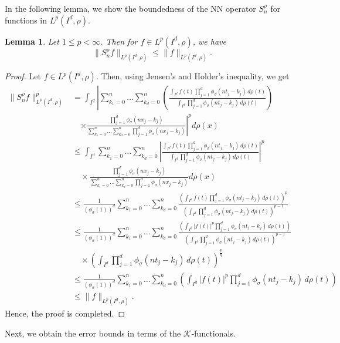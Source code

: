 \documentclass[12pt, reqno]{amsart}
\numberwithin{equation}{section}
\newtheorem{lemma}[theorem]{Lemma}
\theoremstyle{definition}
\theoremstyle{remark}
\numberwithin{equation}{section}
\newcommand{\LP}{L^p(I^d, \rho)}
\begin{document}
In the following lemma, we show the boundedness of the NN operator $S_n^\rho$ for functions in $\LP.$
\begin{lemma} \label{oplpboubd}
Let $1\leq p<\infty$. Then for $f\in \LP$, we have
$$\|S^{\rho}_nf\|_{\LP}\leq\|f\|_{\LP}.$$
\end{lemma}

\begin{proof} 
Let $f\in \LP$. Then, using Jensen's and Holder's inequality, we get
\begin{align*}
    \|S_n^{\rho}f\|_{\LP}^p  &= \int_{I^d} \left| \sum_{k_1=0}^n \ldots \sum_{k_d=0}^n \left( \frac{\int_{I^d} f(t) \prod_{j=1}^d \phi_\sigma(nt_j - k_j) \, d\rho(t)}{\int_{I^d} \prod_{j=1}^d \phi_\sigma(nt_j - k_j) \, d\rho(t)} \right) \right. \\
&\quad \left. \times \frac{\prod_{j=1}^d \phi_\sigma(nx_j - k_j)}{\sum_{k_1=0}^n \ldots \sum_{k_d=0}^n \prod_{j=1}^d \phi_\sigma(nx_j - k_j)} \right|^p d\rho(x) \\
&\leq \int_{I^d}  \sum_{k_1=0}^n \ldots \sum_{k_d=0}^n \left| \frac{\int_{I^d} f(t) \prod_{j=1}^d \phi_\sigma(nt_j - k_j) \, d\rho(t)}{\int_{I^d} \prod_{j=1}^d \phi_\sigma(nt_j - k_j) \, d\rho(t)} \right|^p  \\
&\quad  \times \frac{\prod_{j=1}^d \phi_\sigma(nx_j - k_j)}{\sum_{k_1=0}^n \ldots \sum_{k_d=0}^n \prod_{j=1}^d \phi_\sigma(nx_j - k_j)}  d\rho(x) \\
 &\leq \frac{1}{(\phi_\sigma(1))^d}  \sum_{k_1=0}^n \ldots \sum_{k_d=0}^n  \frac{\left(\int_{I^d} f(t) \prod_{j=1}^d \phi_\sigma(nt_j - k_j) \, d\rho(t)\right)^p}{\left(\int_{I^d} \prod_{j=1}^d \phi_\sigma(nt_j - k_j) \, d\rho(t)\right)^{p-1}}\\
 &\leq \frac{1}{(\phi_\sigma(1))^d}  \sum_{k_1=0}^n \ldots \sum_{k_d=0}^n  \frac{\left(\int_{I^d} |f(t)|^p \prod_{j=1}^d \phi_\sigma(nt_j - k_j) \, d\rho(t)\right)  }{\left(\int_{I^d} \prod_{j=1}^d \phi_\sigma(nt_j - k_j) \, d\rho(t)\right)^{p-1}}\\
 &\quad\times \left(\int_{I^d} \prod_{j=1}^d \phi_\sigma(nt_j - k_j) \, d\rho(t)\right)^{\frac{p}{q}} \\
 &\leq \frac{1}{(\phi_\sigma(1))^d}  \sum_{k_1=0}^n \ldots \sum_{k_d=0}^n  \left(\int_{I^d} |f(t)|^p \prod_{j=1}^d \phi_\sigma(nt_j - k_j) \, d\rho(t)\right) \\
 &\leq \|f\|_{\LP}.
\end{align*}
Hence, the proof is completed. 
\end{proof}
Next, we obtain the error bounds in terms of the $\mathcal{K}$-functionals.
\end{document}
